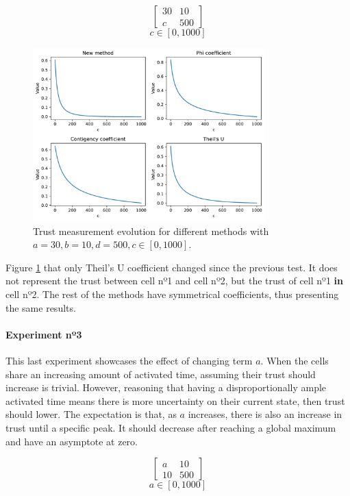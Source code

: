 $$
\begin{bmatrix}
    30 & 10 \\ c & 500
\end{bmatrix}
$$
$$
c \in [0, 1000]
$$
\begin{figure}[h!]
\centering
    \includegraphics[width=0.8\textwidth]{figures/chapter4/cell/trust_tests/2_b.pdf}
    \caption{Trust measurement evolution for different methods with $a=30, b=10, d=500, c \in [0, 1000]$.}
    \label{fig:trust_test_2_b}
\end{figure}
\FloatBarrier

Figure \ref{fig:trust_test_2_b} that only Theil's U coefficient changed since the previous test. It does not represent the trust between cell nº1 and cell nº2, but the trust of cell nº1 \textbf{in} cell nº2. The rest of the methods have symmetrical coefficients, thus presenting the same results.

\paragraph{Experiment nº3} This last experiment showcases the effect of changing term $a$. When the cells share an increasing amount of activated time, assuming their trust should increase is trivial. However, reasoning that having a disproportionally ample activated time means there is more uncertainty on their current state, then trust should lower. The expectation is that, as $a$ increases, there is also an increase in trust until a specific peak. It should decrease after reaching a global maximum and have an asymptote at zero.

$$
\begin{bmatrix}
    a & 10 \\ 10 & 500
\end{bmatrix}
$$
$$
a \in [0, 1000]
$$

